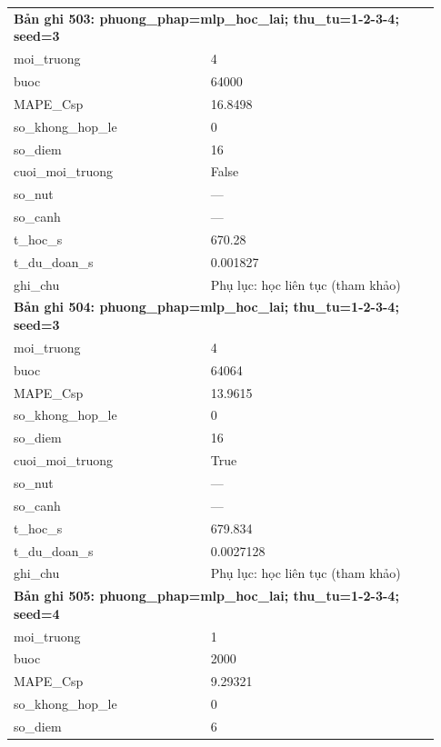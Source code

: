 \begin{longtable}{p{0.43\linewidth}p{0.50\linewidth}}
\midrule
\multicolumn{2}{p{0.95\linewidth}}{\textbf{Bản ghi 503: phuong\_phap=mlp\_hoc\_lai; thu\_tu=1-2-3-4; seed=3}} \\
moi\_\allowbreak truong & 4 \\
buoc & 64000 \\
MAPE\_\allowbreak Csp & 16.8498 \\
so\_\allowbreak khong\_\allowbreak hop\_\allowbreak le & 0 \\
so\_\allowbreak diem & 16 \\
cuoi\_\allowbreak moi\_\allowbreak truong & False \\
so\_\allowbreak nut & — \\
so\_\allowbreak canh & — \\
t\_\allowbreak hoc\_\allowbreak s & 670.28 \\
t\_\allowbreak du\_\allowbreak doan\_\allowbreak s & 0.001827 \\
ghi\_\allowbreak chu & Phụ lục: học liên tục (tham khảo) \\
\midrule
\multicolumn{2}{p{0.95\linewidth}}{\textbf{Bản ghi 504: phuong\_phap=mlp\_hoc\_lai; thu\_tu=1-2-3-4; seed=3}} \\
moi\_\allowbreak truong & 4 \\
buoc & 64064 \\
MAPE\_\allowbreak Csp & 13.9615 \\
so\_\allowbreak khong\_\allowbreak hop\_\allowbreak le & 0 \\
so\_\allowbreak diem & 16 \\
cuoi\_\allowbreak moi\_\allowbreak truong & True \\
so\_\allowbreak nut & — \\
so\_\allowbreak canh & — \\
t\_\allowbreak hoc\_\allowbreak s & 679.834 \\
t\_\allowbreak du\_\allowbreak doan\_\allowbreak s & 0.0027128 \\
ghi\_\allowbreak chu & Phụ lục: học liên tục (tham khảo) \\
\midrule
\multicolumn{2}{p{0.95\linewidth}}{\textbf{Bản ghi 505: phuong\_phap=mlp\_hoc\_lai; thu\_tu=1-2-3-4; seed=4}} \\
moi\_\allowbreak truong & 1 \\
buoc & 2000 \\
MAPE\_\allowbreak Csp & 9.29321 \\
so\_\allowbreak khong\_\allowbreak hop\_\allowbreak le & 0 \\
so\_\allowbreak diem & 6 \\

\end{longtable}
